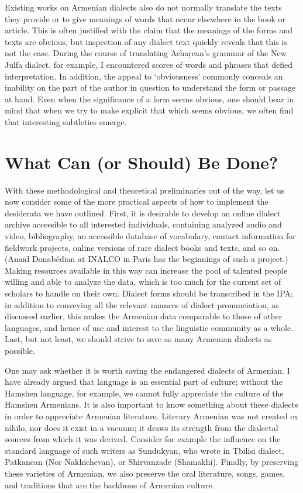 \begin{exe}
Existing works on Armenian dialects also do not normally translate the texts they provide or to give meanings of words that occur elsewhere in the book or article. This is often justified with the claim that the meanings of the forms and texts are obvious, but inspection of any dialect text quickly reveals that this is not the case. During the course of translating Achaṛean’s grammar of the New Julfa dialect, for example, I encountered scores of words and phrases that defied interpretation. In addition, the appeal to ‘obviousness’ commonly conceals an inability on the part of the author in question to understand the form or passage at hand. Even when the significance of a form seems obvious, one should bear in mind that when we try to make explicit that which seems obvious, we often find that interesting subtleties emerge.


\section{What Can (or Should) Be Done?}

With these methodological and theoretical preliminaries out of the way, let us now consider some of the more practical aspects of how to implement the desiderata we have outlined. First, it is desirable to develop an online dialect archive accessible to all interested individuals, containing analyzed audio and video, bibliography, an accessible database of vocabulary, contact information for fieldwork projects, online versions of rare dialect books and texts, and so on. (Anaïd Donabédian at INALCO in Paris has the beginnings of such a project.) Making resources available in this way can increase the pool of talented people willing and able to analyze the data, which is too much for the current set of scholars to handle on their own. Dialect forms should be transcribed in the IPA; in addition to conveying all the relevant nuances of dialect pronunciation, as discussed earlier, this makes the Armenian data comparable to those of other languages, and hence of use and interest to the linguistic community as a whole. Last, but not least, we should strive to save as many Armenian dialects as possible.

One may ask whether it is worth saving the endangered dialects of Armenian. I have already argued that language is an essential part of culture; without the Hamshen language, for example, we cannot fully appreciate the culture of the Hamshen Armenians. It is also important to know something about these dialects in order to appreciate Armenian literature. Literary Armenian was not created ex nihilo, nor does it exist in a vacuum; it draws its strength from the dialectal sources from which it was derived. Consider for example the influence on the standard language of such writers as Sundukyan, who wrote in Tbilisi dialect, Patkanean (Nor Nakhichevan), or Shirvanzade (Shamakhi). Finally, by preserving these varieties of Armenian, we also preserve the oral literature, songs, games, and traditions that are the backbone of Armenian culture.


\end{exe}

